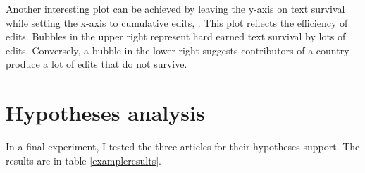 Another interesting plot can be achieved by leaving the y-axis on text survival while setting the x-axis to cumulative edits, .
This plot reflects the efficiency of edits. 
Bubbles in the upper right represent hard earned text survival by lots of edits.
Conversely, a bubble in the lower right suggests contributors of a country produce a lot of edits that do not survive.

\section{Hypotheses analysis}

In a final experiment, I tested the three articles for their hypotheses support.
The results are in table \ref{exampleresults}.

